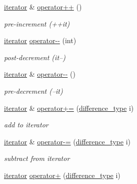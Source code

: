 \begin{DoxyCompactItemize}
\hyperlink{classnlohmann_1_1basic__json_1_1iterator}{iterator} \& \hyperlink{classnlohmann_1_1basic__json_1_1iterator_a050b7fa21051ea57e5b0cc03668b5d4a}{operator++} ()
\begin{DoxyCompactList}\small\item\em pre-\/increment (++it) \end{DoxyCompactList}\item 
\hyperlink{classnlohmann_1_1basic__json_1_1iterator}{iterator} \hyperlink{classnlohmann_1_1basic__json_1_1iterator_ab4f238aa5fcf452b1884b748b0395b1f}{operator-\/-\/} (int)
\begin{DoxyCompactList}\small\item\em post-\/decrement (it--) \end{DoxyCompactList}\item 
\hyperlink{classnlohmann_1_1basic__json_1_1iterator}{iterator} \& \hyperlink{classnlohmann_1_1basic__json_1_1iterator_ab3679dc63b3a59edb98b1c2b96d8683c}{operator-\/-\/} ()
\begin{DoxyCompactList}\small\item\em pre-\/decrement (--it) \end{DoxyCompactList}\item 
\hyperlink{classnlohmann_1_1basic__json_1_1iterator}{iterator} \& \hyperlink{classnlohmann_1_1basic__json_1_1iterator_ae0c848dbc0af1cde15771d45d775b27c}{operator+=} (\hyperlink{classnlohmann_1_1basic__json_1_1const__iterator_a49d7c3e9ef3280df03052cce988b792f}{difference\-\_\-type} i)
\begin{DoxyCompactList}\small\item\em add to iterator \end{DoxyCompactList}\item 
\hyperlink{classnlohmann_1_1basic__json_1_1iterator}{iterator} \& \hyperlink{classnlohmann_1_1basic__json_1_1iterator_afe86d48d3e4e5ebdaaec162b3cf0e95c}{operator-\/=} (\hyperlink{classnlohmann_1_1basic__json_1_1const__iterator_a49d7c3e9ef3280df03052cce988b792f}{difference\-\_\-type} i)
\begin{DoxyCompactList}\small\item\em subtract from iterator \end{DoxyCompactList}\item 
\hyperlink{classnlohmann_1_1basic__json_1_1iterator}{iterator} \hyperlink{classnlohmann_1_1basic__json_1_1iterator_a56952f8d5702541f0d88e6a764d2ae36}{operator+} (\hyperlink{classnlohmann_1_1basic__json_1_1const__iterator_a49d7c3e9ef3280df03052cce988b792f}{difference\-\_\-type} i)

\end{DoxyCompactItemize}
